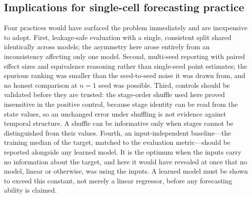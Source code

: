 \documentclass[10pt,letterpaper]{article}
\begin{document}
\subsection*{Implications for single-cell forecasting practice}
Four practices would have surfaced the problem immediately and are inexpensive to adopt. First, leakage-safe evaluation with a single, consistent split shared identically across models; the asymmetry here arose entirely from an inconsistency affecting only one model. Second, multi-seed reporting with paired effect sizes and equivalence reasoning rather than single-seed point estimates; the spurious ranking was smaller than the seed-to-seed noise it was drawn from, and no honest comparison at $n=1$ seed was possible. Third, controls should be validated before they are trusted: the stage-order shuffle used here proved insensitive in the positive control, because stage identity can be read from the state values, so an unchanged error under shuffling is not evidence against temporal structure. A shuffle can be informative only when stages cannot be distinguished from their values. Fourth, an input-independent baseline---the training median of the target, matched to the evaluation metric---should be reported alongside any learned model. It is the optimum when the inputs carry no information about the target, and here it would have revealed at once that no model, linear or otherwise, was using the inputs. A learned model must be shown to exceed this constant, not merely a linear regressor, before any forecasting ability is claimed.
\end{document}
